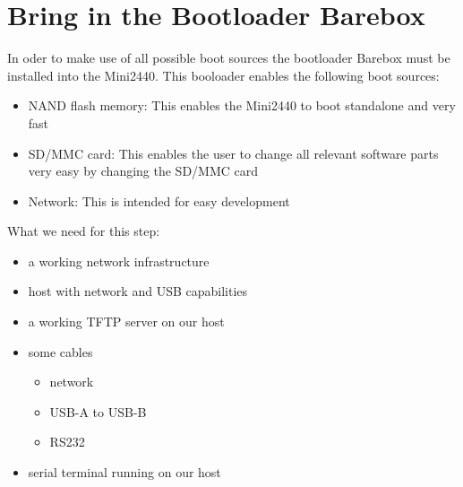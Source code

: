 %
%
%
%
%
%
%

\section{Bring in the Bootloader Barebox}	\label{sec:deploying}

In oder to make use of all possible boot sources the bootloader Barebox must
be installed into the Mini2440. This booloader enables the following boot
sources:

\begin{itemize}
	\item NAND flash memory: This enables the Mini2440 to boot standalone
	and very fast
	\item SD/MMC card: This enables the user to change all relevant
	software parts very easy by changing the SD/MMC card
	\item Network: This is intended for easy development
\end{itemize}

What we need for this step:

\begin{itemize}
 \item a working network infrastructure
 \item host with network and USB capabilities
 \item a working TFTP server on our host
 \item some cables
 \begin{itemize}
  \item network
  \item USB-A to USB-B
  \item RS232
 \end{itemize}
 \item serial terminal running on our host
\end{itemize}

